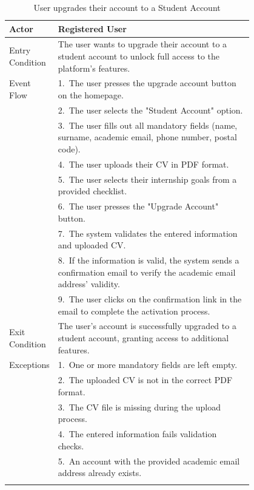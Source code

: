 \begin{center} 
    \renewcommand{\arraystretch}{1.2} 
    \begin{longtable}{ l p{0.8\linewidth} } 
        \hline 
        Actor & Registered User \\ \hline 
        Entry Condition & The user wants to upgrade their account to a student account to unlock full access to the platform's features. \\ \hline 
        Event Flow & 1.\ The user presses the upgrade account button on the homepage. \\ 
        & 2.\ The user selects the "Student Account" option. \\  
        & 3.\ The user fills out all mandatory fields (name, surname, academic email, phone number, postal code). \\ 
        & 4.\ The user uploads their CV in PDF format. \\ 
        & 5.\ The user selects their internship goals from a provided checklist. \\ 
        & 6.\ The user presses the "Upgrade Account" button. \\ 
        & 7.\ The system validates the entered information and uploaded CV. \\ 
        & 8.\ If the information is valid, the system sends a confirmation email to verify the academic email address' validity. \\ 
        & 9.\ The user clicks on the confirmation link in the email to complete the activation process. \\ \hline 
        Exit Condition & The user's account is successfully upgraded to a student account, granting access to additional features. \\ \hline 
        Exceptions & 1.\ One or more mandatory fields are left empty. \\ 
        & 2.\ The uploaded CV is not in the correct PDF format. \\ 
        & 3.\ The CV file is missing during the upload process. \\ 
        & 4.\ The entered information fails validation checks. \\
        & 5.\ An account with the provided academic email address already exists. \\ \hline 
        \caption{User upgrades their account to a Student Account} 
        \label{tab:student_activation_uc} 
    \end{longtable} 
\end{center}

